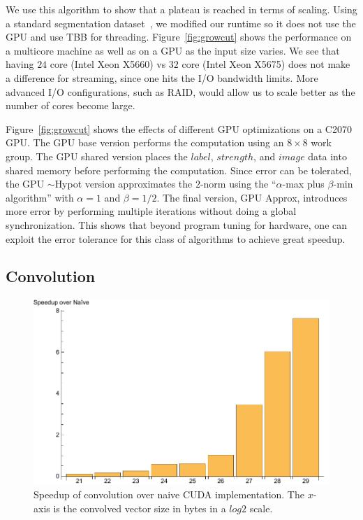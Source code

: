 We use this algorithm to show that a plateau is reached in terms of scaling.
Using a standard segmentation dataset~\cite{gridcut}, we modified our runtime so
  it does not use the GPU and use TBB for threading. Figure~\ref{fig:growcut} shows the
  performance on a multicore machine as well as on a GPU as the input
  size varies.
We see that having $24$ core (Intel Xeon X5660) vs $32$ core (Intel Xeon X5675) does not make a difference for streaming, since
  one hits the I/O bandwidth limits.
More advanced I/O configurations, such as RAID, would allow us to scale better as the number of cores become large.

Figure~\ref{fig:growcut} shows the effects of different GPU optimizations on a C2070 GPU.
The GPU base version performs the computation using an $8 \times 8$ work group.
The GPU shared version places the $label$, $strength$, and $image$ data into 
  shared memory before performing the computation.
Since error can be tolerated, the GPU $\sim$Hypot version approximates
  the $2$-norm using the  ``$\alpha$-max plus $\beta$-min algorithm'' with
  $\alpha = 1$ and $\beta = 1/2$.
The final version, GPU Approx, introduces more error by performing multiple iterations without doing a global synchronization.
This shows that beyond program tuning for hardware, one can exploit the error tolerance for this class of algorithms to achieve great speedup.


\subsection{Convolution}

\begin{figure}
\centering
\includegraphics[scale=0.5]{data/stencil.pdf}
\caption{Speedup of convolution over naive CUDA implementation.
  The $x$-axis is the convolved vector size in bytes in a $log2$ scale.}
\label{fig:stencil}
\centering
\end{figure}

